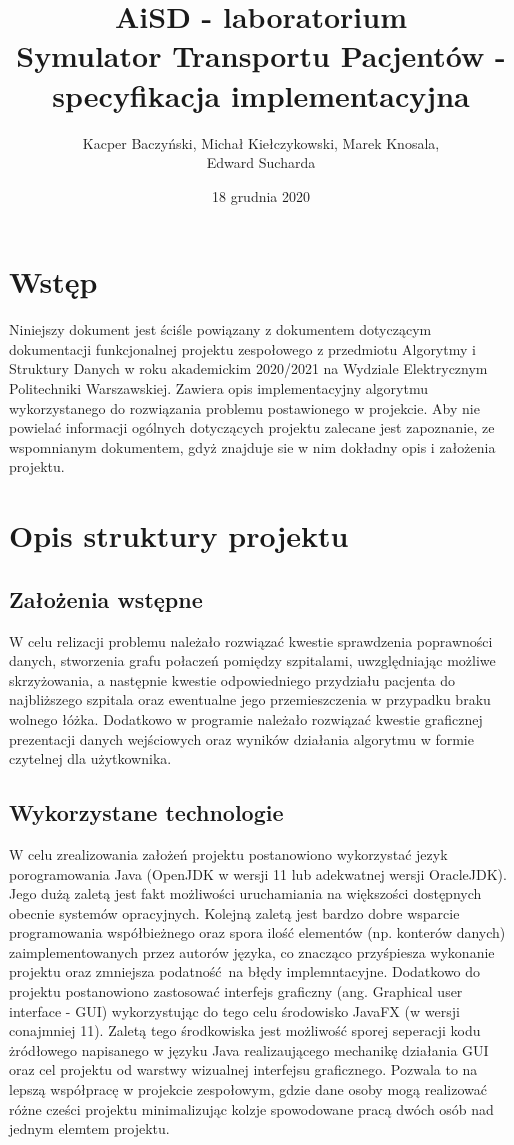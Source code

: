 \documentclass[10pt,a4paper]{article}
\title{\huge AiSD - laboratorium \\ \Large Symulator Transportu Pacjentów - specyfikacja implementacyjna}
\author{Kacper Baczyński, Michał Kiełczykowski, Marek Knosala, \\ Edward Sucharda}
\begin{document}
\date{18 grudnia 2020}

\maketitle

\section{Wstęp}

Niniejszy dokument jest ściśle powiązany z dokumentem dotyczącym dokumentacji funkcjonalnej projektu zespołowego z przedmiotu Algorytmy i Struktury Danych w roku akademickim 2020/2021 na Wydziale Elektrycznym Politechniki Warszawskiej.
Zawiera opis implementacyjny algorytmu wykorzystanego do rozwiązania problemu postawionego w projekcie.
Aby nie powielać informacji ogólnych dotyczących projektu zalecane jest zapoznanie, ze wspomnianym dokumentem, gdyż znajduje sie w nim dokładny opis i założenia projektu.

\section{Opis struktury projektu}

\subsection{Założenia wstępne}


W celu relizacji problemu należało rozwiązać kwestie sprawdzenia poprawności danych, stworzenia grafu połaczeń pomiędzy szpitalami, uwzględniając możliwe skrzyżowania, a następnie kwestie odpowiedniego przydziału pacjenta do najbliższego
szpitala oraz ewentualne jego przemieszczenia w przypadku braku wolnego łóżka.
Dodatkowo w programie należało rozwiązać kwestie graficznej prezentacji danych wejściowych oraz wyników działania algorytmu w formie czytelnej dla użytkownika.

\subsection{Wykorzystane technologie}

W celu zrealizowania założeń projektu postanowiono wykorzystać jezyk porogramowania Java (OpenJDK w wersji 11 lub adekwatnej wersji OracleJDK).
Jego dużą zaletą jest fakt możliwości uruchamiania na większości dostępnych obecnie systemów opracyjnych.
Kolejną zaletą jest bardzo dobre wsparcie programowania współbieżnego oraz spora ilość elementów (np. konterów danych) zaimplementowanych przez autorów języka, co znacząco przyśpiesza wykonanie projektu oraz zmniejsza podatność na błędy implemntacyjne.
Dodatkowo do projektu postanowiono zastosować interfejs graficzny (ang. Graphical user interface - GUI) wykorzystując do tego celu środowisko JavaFX (w wersji conajmniej 11).
Zaletą tego środkowiska jest możliwość sporej seperacji kodu żródłowego napisanego w języku Java realizaującego mechanikę działania GUI oraz cel projektu od warstwy wizualnej interfejsu graficznego.
Pozwala to na lepszą współpracę w projekcie zespołowym, gdzie dane osoby mogą realizować różne cześci projektu minimalizując kolzje spowodowane pracą dwóch osób nad jednym elemtem projektu.
\end{document}

